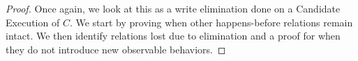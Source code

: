 \begin{proof}
    Once again, we look at this as a write elimination done on a Candidate Execution of $C$. 
    We start by proving when other happens-before relations remain intact. 
    We then identify relations lost due to elimination and a proof for when they do not introduce new observable behaviors. 
    
   
   
   
   

\end{proof}